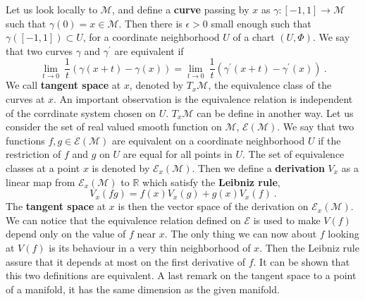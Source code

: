 \documentclass[10pt]{book}
\newcommand{\Ecal}{\mathcal{E}}
\newcommand{\Mcal}{\mathcal{M}}
\newcommand{\Rbb}{\mathbb{R}}
\theoremstyle{break}
\begin{document}
Let us look locally to $\Mcal$, and define a \textbf{curve} passing by $x$ as $\gamma : [-1,1] \to \Mcal$ such that $\gamma(0) = x \in \Mcal$. Then there is $\epsilon > 0$ small enough such that $\gamma([-1,1]) \subset U$, for a coordinate neighborhood $U$ of a chart $(U,\Phi)$. We say that two curves $\gamma$ and $\gamma^\prime$ are equivalent if
%
\begin{equation*}
\underset{t \to 0}{\lim} \ \frac{1}{t} \left( \gamma(x+t) - \gamma(x) \right) = \underset{t \to 0}{\lim} \ \frac{1}{t} \left( \gamma^\prime(x+t) - \gamma^\prime(x) \right) \ .
\end{equation*}
%
We call \textbf{tangent space} at $x$, denoted by $T_x\Mcal$, the equivalence class of the curves at $x$. An important observation is the equivalence relation is independent of the corrdinate system chosen on $U$. $T_x\Mcal$ can be define in another way. Let us consider the set of real valued smooth function on $\Mcal$, $\Ecal(\Mcal)$. We say that two functions $f, g \in \Ecal(\Mcal)$ are equivalent on a coordinate neighborhood $U$ if the restriction of $f$ and $g$ on $U$ are equal for all points in $U$. The set of equivalence classes at a point $x$ is denoted by $\Ecal_x(\Mcal)$. Then we define a \textbf{derivation} $V_x$ as a linear map from $\Ecal_x(\Mcal)$ to $\Rbb$ which satisfy the \textbf{Leibniz rule},
%
\begin{equation*}
V_x(fg) = f(x) V_x(g) + g(x) V_x(f) \ .
\end{equation*}
%
The \textbf{tangent space} at $x$ is then the vector space of the derivation on $\Ecal_x(\Mcal)$. We can notice that the equivalence relation defined on $\Ecal$ is used to make $V(f)$ depend only on the value of $f$ near $x$. The only thing we can now about $f$ looking at $V(f)$ is its behaviour in a very thin neighborhood of $x$. Then the Leibniz rule assure that it depends at most on the first derivative of $f$. It can be shown that this two definitions are equivalent.
A last remark on the tangent space to a point of a manifold, it has the same dimension as the given manifold.


\bigskip
\end{document}
